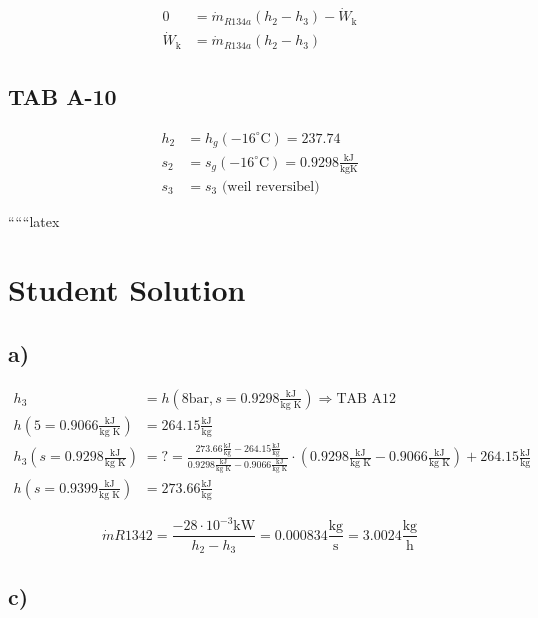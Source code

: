 \begin{align*}
    0 &= \dot{m}_{R134a} (h_2 - h_3) - \dot{W}_\text{k} \\
    \dot{W}_\text{k} &= \dot{m}_{R134a} (h_2 - h_3)
\end{align*}

\subsection*{TAB A-10}

\begin{align*}
    h_2 &= h_g (-16^\circ \text{C}) = 237.74 \\
    s_2 &= s_g (-16^\circ \text{C}) = 0.9298 \frac{\text{kJ}}{\text{kgK}} \\
    s_3 &= s_3 \text{ (weil reversibel)}
\end{align*}

``````latex


\section*{Student Solution}

\subsection*{a)}

\begin{align*}
h_3 &= h \left( 8 \text{bar}, s = 0.9298 \frac{\text{kJ}}{\text{kg K}} \right) \Rightarrow \text{TAB A12} \\
h \left( 5 = 0.9066 \frac{\text{kJ}}{\text{kg K}} \right) &= 264.15 \frac{\text{kJ}}{\text{kg}} \\
h_3 \left( s = 0.9298 \frac{\text{kJ}}{\text{kg K}} \right) &= ? = \frac{273.66 \frac{\text{kJ}}{\text{kg}} - 264.15 \frac{\text{kJ}}{\text{kg}}}{0.9298 \frac{\text{kJ}}{\text{kg K}} - 0.9066 \frac{\text{kJ}}{\text{kg K}}} \cdot \left( 0.9298 \frac{\text{kJ}}{\text{kg K}} - 0.9066 \frac{\text{kJ}}{\text{kg K}} \right) + 264.15 \frac{\text{kJ}}{\text{kg}} \\
h \left( s = 0.9399 \frac{\text{kJ}}{\text{kg K}} \right) &= 273.66 \frac{\text{kJ}}{\text{kg}}
\end{align*}

\[
\dot{m} R1342 = \frac{-28 \cdot 10^{-3} \text{kW}}{h_2 - h_3} = 0.000834 \frac{\text{kg}}{\text{s}} = 3.0024 \frac{\text{kg}}{\text{h}}
\]

\subsection*{c)}

